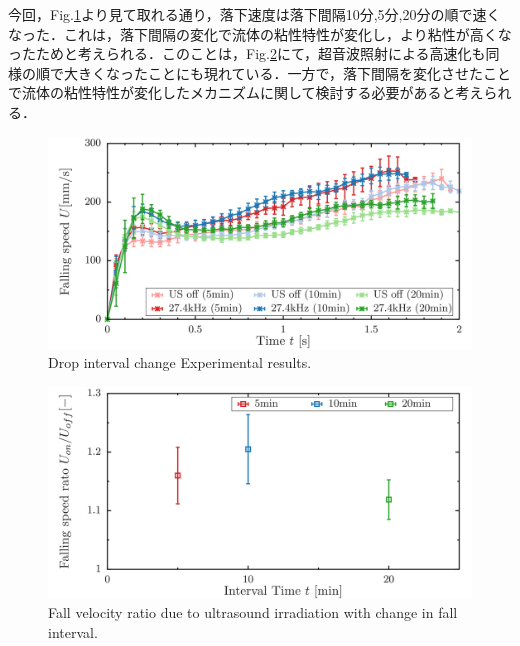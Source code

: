 今回，Fig.\ref{fig:interval-change}より見て取れる通り，落下速度は落下間隔10分,5分,20分の順で速くなった．これは，落下間隔の変化で流体の粘性特性が変化し，より粘性が高くなったためと考えられる．このことは，Fig.\ref{fig:speed-diff}にて，超音波照射による高速化も同様の順で大きくなったことにも現れている．一方で，落下間隔を変化させたことで流体の粘性特性が変化したメカニズムに関して検討する必要があると考えられる．

\begin{figure}[ht]
    \begin{center}
        \includegraphics[width=13cm,clip]{5-Discussion/interval.png} 
        \caption{Drop interval change Experimental results.}
        \label{fig:interval-change}
    \end{center}
\end{figure}

\begin{figure}[ht]
    \begin{center}
        \includegraphics[width=13cm,clip]{5-Discussion/diff.png}
        \caption{Fall velocity ratio due to ultrasound irradiation with change in fall interval.}
        \label{fig:speed-diff}
    \end{center}
\end{figure}